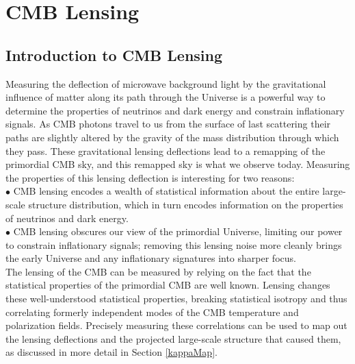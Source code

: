  
\chapter{CMB Lensing}


\def\nnu{N_{\mathrm eff}}
\def\gtrsim{\raise-.75ex\hbox{$\buildrel>\over\sim$}}

\section{Introduction to CMB Lensing}

Measuring the deflection of microwave background light by the gravitational influence of matter along its path through the Universe is a powerful way to determine the properties of neutrinos and dark energy and constrain inflationary signals.  As CMB photons travel to us from the surface of last scattering their paths are slightly altered by the gravity of the mass distribution through which they pass.  These gravitational lensing deflections lead to a remapping of the primordial CMB sky, and this remapped sky is what we observe today.  Measuring the properties of this lensing deflection is interesting for two reasons:\\


$\bullet$ CMB lensing encodes a wealth of statistical information about the entire large-scale structure distribution, which in turn encodes information on the properties of neutrinos and dark energy.\\


$\bullet$ CMB lensing obscures our view of the primordial Universe, limiting our power to constrain inflationary signals; removing this lensing noise more cleanly brings the early Universe and any inflationary signatures into sharper focus.\\

The lensing of the CMB can be measured by relying on the fact that the statistical properties of the primordial CMB are well known.  Lensing changes these well-understood statistical properties, breaking statistical isotropy and thus correlating formerly independent modes of the CMB temperature and polarization fields.  Precisely measuring these correlations can be used to map out the lensing deflections and the projected large-scale structure that caused them, as discussed in more detail in Section \ref{kappaMap}.

